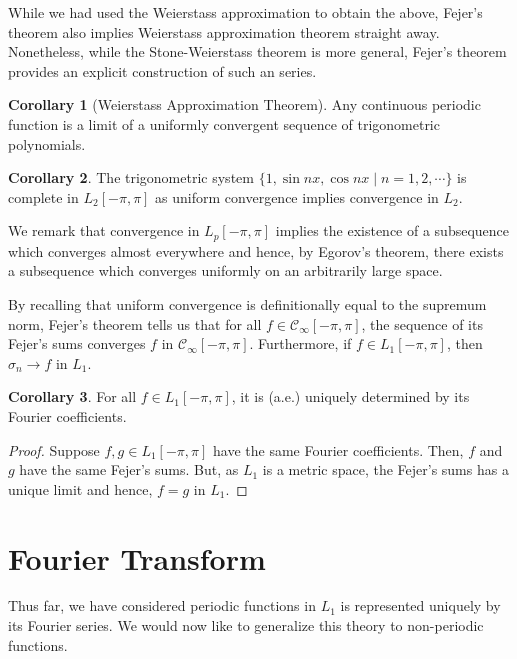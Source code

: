 \documentclass[]{article}
\theoremstyle{definition}
\newtheorem{corollary}{Corollary}[theorem]
\theoremstyle{definition}
\begin{document}
While we had used the Weierstass approximation to obtain the above, Fejer's theorem 
also implies Weierstass approximation theorem straight away. Nonetheless, while 
the Stone-Weierstass theorem is more general, Fejer's theorem provides an explicit 
construction of such an series.

\begin{corollary}[Weierstass Approximation Theorem]
  Any continuous periodic function is a limit of a uniformly convergent sequence 
  of trigonometric polynomials.
\end{corollary}

\begin{corollary}
  The trigonometric system \(\{1, \sin nx, \cos nx \mid n = 1, 2, \cdots\}\) is 
  complete in \(L_2[-\pi, \pi]\) as uniform convergence implies convergence in \(L_2\).
\end{corollary}

We remark that convergence in \(L_p[-\pi, \pi]\) implies the existence of a subsequence which 
converges almost everywhere and hence, by Egorov's theorem, there exists a subsequence 
which converges uniformly on an arbitrarily large space.

By recalling that uniform convergence is definitionally equal to the supremum norm, 
Fejer's theorem tells us that for all \(f \in \mathcal{C}_\infty[-\pi, \pi]\), 
the sequence of its Fejer's sums converges \(f\) in \(\mathcal{C}_\infty[-\pi, \pi]\).
Furthermore, if \(f \in L_1[-\pi, \pi]\), then \(\sigma_n \to f\) in \(L_1\).

\begin{corollary}
  For all \(f \in L_1[-\pi, \pi]\), it is (a.e.) uniquely determined by its 
  Fourier coefficients. 
\end{corollary}
\begin{proof}
  Suppose \(f, g \in L_1[-\pi, \pi]\) have the same Fourier coefficients. Then,
  \(f\) and \(g\) have the same Fejer's sums. But, as \(L_1\) is a metric space, 
  the Fejer's sums has a unique limit and hence, \(f = g\) in \(L_1\).
\end{proof}

\newpage
\section{Fourier Transform}

Thus far, we have considered periodic functions in \(L_1\) is represented uniquely 
by its Fourier series. We would now like to generalize this theory to non-periodic 
functions. 
\end{document}
